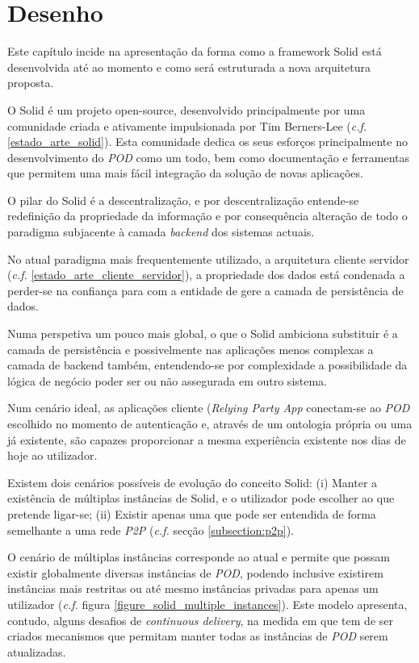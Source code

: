 
\chapter{Desenho \label{desenho}}
\label{cap:4}

Este capítulo incide na apresentação da forma como a framework Solid está desenvolvida até ao momento e como será estruturada a nova arquitetura proposta.

O Solid é um projeto open-source, desenvolvido principalmente por uma comunidade criada e ativamente impulsionada por Tim Berners-Lee (\emph{c.f.} \ref{estado_arte_solid}). Esta comunidade dedica os seus esforços principalmente no desenvolvimento do \emph{\acrshort{POD}} como um todo, bem como documentação e ferramentas que permitem uma mais fácil integração da solução de novas aplicações.

O pilar do Solid é a descentralização, e por descentralização entende-se redefinição da propriedade da informação e por consequência alteração de todo o paradigma subjacente à camada \emph{backend} dos sistemas actuais. 

No atual paradigma mais frequentemente utilizado, a arquitetura cliente servidor (\emph{c.f.} \ref{estado_arte_cliente_servidor}), a propriedade dos dados está condenada a perder-se na confiança para com a entidade de gere a camada de persistência de dados.

Numa perspetiva um pouco mais global, o que o Solid ambiciona substituir é a camada de persistência e possivelmente nas aplicações menos complexas a camada de backend também, entendendo-se por complexidade a possibilidade da lógica de negócio poder ser ou não assegurada em outro sistema.

Num cenário ideal, as aplicações cliente (\emph{Relying Party App} conectam-se ao \emph{\acrshort{POD}} escolhido no momento de autenticação e, através de um ontologia própria ou uma já existente, são capazes proporcionar a mesma experiência existente nos dias de hoje ao utilizador.

Existem dois cenários possíveis de evolução do conceito Solid: (i) Manter a existência de múltiplas instâncias de Solid, e o utilizador pode escolher ao que pretende ligar-se; (ii) Existir apenas uma que pode ser entendida de forma semelhante a uma rede \emph{P2P} (\emph{c.f.} secção \ref{subsection:p2p}).

O cenário de múltiplas instâncias corresponde ao atual e permite que possam existir globalmente diversas instâncias de \emph{\acrshort{POD}}, podendo inclusive existirem instâncias mais restritas ou até mesmo instâncias privadas para apenas um utilizador (\emph{c.f.} figura \ref{figure_solid_multiple_instances}). Este modelo apresenta, contudo, alguns desafios de \emph{continuous delivery}, na medida em que tem de ser criados mecanismos que permitam manter todas as instâncias de \emph{\acrshort{POD}} serem atualizadas.

